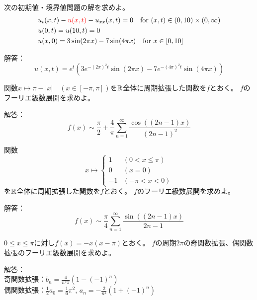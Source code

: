 \documentclass[report]{jlreq}
\begin{document}
\begin{problem}
    次の初期値・境界値問題の解を求めよ。
    \begin{equation}
        \begin{split}
            &u_t(x, t) - \textcolor{red}{u(x, t)} - u_{xx}(x, t) = 0 \quad \text{for $(x, t) \in (0, 10) \times (0, \infty)$} \\
            &u(0, t) = u(10, t) = 0 \\
            &u(x, 0) = 3 \sin(2\pi x) - 7 \sin(4\pi x) \quad \text{for $x \in [0, 10]$}
        \end{split}
    \end{equation}

    解答：
    \begin{equation}
        u(x, t) = e^t \left( 3 e^{-(2\pi)^2 t} \sin(2\pi x) - 7 e^{-(4\pi)^2 t} \sin(4\pi x) \right)
    \end{equation}
\end{problem}

\begin{problem}
    関数$x \mapsto \pi - |x| \quad(x \in [-\pi, \pi])$を$\mathbb{R}$全体に周期拡張した関数を$f$とおく。
    $f$のフーリエ級数展開を求めよ。

    解答：
    \begin{equation}
        f(x) \sim
            \frac{\pi}{2} + \frac{4}{\pi} \sum_{n=1}^\infty \frac{\cos((2n-1)x)}{(2n-1)^2}
    \end{equation}
\end{problem}

\begin{problem}
    関数
    \begin{equation}
        x \mapsto \begin{cases}
            1 &(0 < x \le \pi) \\
            0 &(x = 0) \\
            -1 &(-\pi < x < 0)
        \end{cases}
    \end{equation}
    を$\mathbb{R}$全体に周期拡張した関数を$f$とおく。
    $f$のフーリエ級数展開を求めよ。

    解答：
    \begin{equation}
        f(x) \sim
            \frac{\pi}{4} \sum_{n=1}^\infty \frac{\sin((2n-1)x)}{2n-1}
    \end{equation}
\end{problem}

\begin{problem}
    $0 \le x \le \pi$に対し$f(x) = -x (x - \pi)$とおく。
    $f$の周期$2\pi$の奇関数拡張、偶関数拡張のフーリエ級数展開を求めよ。

    解答：\\
    奇関数拡張：$b_n = \frac{4}{n^3 \pi} (1 - (-1)^n)$\\[0.5em]
    偶関数拡張：$\frac{1}{2} a_0 = \frac{1}{6} \pi^2,\, a_n = - \frac{2}{n^2} (1 + (-1)^n)$
\end{problem}
\end{document}
